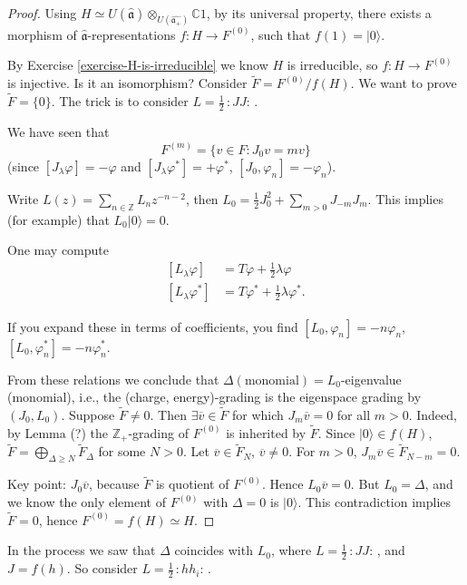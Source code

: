 \begin{proof}
Using $H \simeq
U(\hat{\mathfrak{a}})
\otimes_{U(\hat{\mathfrak{a}_+})}\mathbb{C}
1$,
by its universal property, there exists a
morphism of
 $\hat{\mathfrak{a}}$-representations
$f: H \to F^{(0)}$, such that
$f(1)=|0\rangle$.

By Exercise \ref{exercise-H-is-irreducible}
we know $H$ is irreducible, so
$f:H \to F^{(0)}$ is injective.
Is it an isomorphism?
Consider  $\tilde{F}=F^{(0)}/f(H)$.
We want to prove $\tilde{F}=\{0\}$.
The trick is to consider
$L=\frac{1}{2}\,:\!J J\!:\,$.

We have seen that
$$
F^{(m)}=\{v \in F: J_0v=mv\}
$$
(since $[J_\lambda \varphi]=-\varphi$ and
$[J_\lambda \varphi^*]=+\varphi^*$,
$[J_0,\varphi_n]=-\varphi_n$).

Write $L(z)=\sum_{n \in
\mathbb{Z}}L_nz^{-n-2}$,
then
$L_0=\frac{1}{2}J_0^2+\sum_{m>0}J_{-m}J_m$.
This implies (for example) that
$L_0|0\rangle=0$.

One may compute
$$
\begin{aligned}
[L_\lambda
\varphi]&=T\varphi+\frac{1}{2}
\lambda\varphi\\
[L_\lambda\varphi^* ]&=T\varphi^*
+\frac{1}{2}\lambda \varphi^*.
\end{aligned}
$$

\noindent
If you expand these in terms of coefficients,
you find
$[L_0,\varphi_n]=-n\varphi_n$,
$[L_0,\varphi_n^*]=-n\varphi_n^*$.

From these relations we conclude that
$\Delta(\text{monomial})=L_0$-eigenvalue
(monomial), i.e.,
the (charge, energy)-grading is the
eigenspace grading by $(J_0,L_0)$.
Suppose $\tilde{F}\neq 0$.
Then $\exists \overline{v} \in \tilde{F}$ for
which
$J_m \overline{v}=0$ for all $m>0$.
Indeed, by Lemma (?) the
$\mathbb{Z}_+$-grading
of $F^{(0)}$ is inherited by $\tilde{F}$.
Since $|0\rangle \in f(H)$,
$\tilde{F}=\bigoplus_{\Delta \geq
N}\tilde{F}_{\Delta}$
for some $N>0$. Let $\overline{v} \in
\tilde{F}_N$,
$\overline{v}\neq 0$.
For $m>0$, $J_m \overline{v} \in
\tilde{F}_{N-m}=0$.

Key point: $J_0 \overline{v}$, because
$\tilde{F}$ is quotient of $F^{(0)}$.
Hence $L_0\overline{v}=0$.
But $L_0=\Delta$, and we know the only
element of $F^{(0)}$
with $\Delta=0$ is $|0\rangle$.
This contradiction implies $\tilde{F}=0$,
hence $F^{(0)}=f(H) \simeq H$.
\end{proof}

In the process we saw that
$\Delta$ coincides with $L_0$,
where $L=\frac{1}{2}\,:\!J J\!:\,$,
and $J=f(h)$. So consider
$L=\frac{1}{2}\,:\!h h_i\!:\,$.

